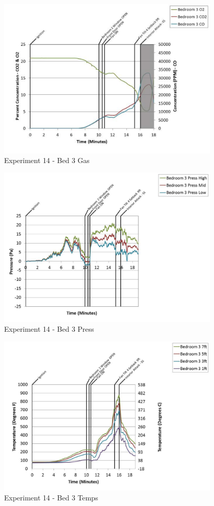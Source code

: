\documentclass{article}
\begin{document}
\begin{appendices}
	\clearpage

	\begin{figure}[h!]
		\centering
		\includegraphics[height=3.05in]{0_Images/Results_Charts/Exp_14_Charts/Bed3Gas.pdf}
		\caption{Experiment 14 - Bed 3 Gas}
	\end{figure}
 

	\begin{figure}[h!]
		\centering
		\includegraphics[height=3.05in]{0_Images/Results_Charts/Exp_14_Charts/Bed3Press.pdf}
		\caption{Experiment 14 - Bed 3 Press}
	\end{figure}
 
	\clearpage

	\begin{figure}[h!]
		\centering
		\includegraphics[height=3.05in]{0_Images/Results_Charts/Exp_14_Charts/Bed3Temps.pdf}
		\caption{Experiment 14 - Bed 3 Temps}
	\end{figure}
 


\end{appendices}
\end{document}
